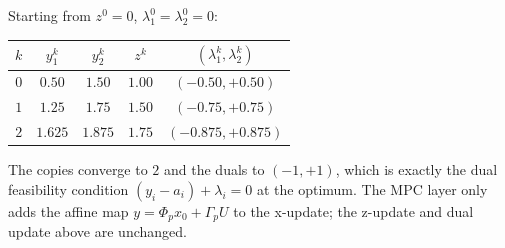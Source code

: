 \documentclass[11pt]{article}
\begin{document}
Starting from $z^0 = 0$, $\lambda_1^0 = \lambda_2^0 = 0$:

\begin{center}
\begin{tabular}{c|cc|cc}
$k$ & $y_1^k$ & $y_2^k$ & $z^k$ & $(\lambda_1^k, \lambda_2^k)$ \\
\hline
$0$ & $0.50$ & $1.50$ & $1.00$ & $(-0.50, +0.50)$ \\
$1$ & $1.25$ & $1.75$ & $1.50$ & $(-0.75, +0.75)$ \\
$2$ & $1.625$ & $1.875$ & $1.75$ & $(-0.875, +0.875)$
\end{tabular}
\end{center}

The copies converge to $2$ and the duals to $(-1, +1)$, which is exactly the dual
feasibility condition $(y_i - a_i) + \lambda_i = 0$ at the optimum. The MPC layer only
adds the affine map $y = \Phi_p x_0 + \Gamma_p U$ to the x-update; the z-update and dual
update above are unchanged.

\nocite{*}


\end{document}
